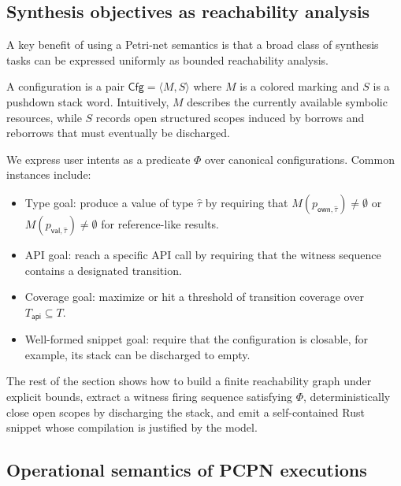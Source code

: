 \documentclass[sigconf]{acmart}
\begin{document}
\subsection{Synthesis objectives as reachability analysis}
\label{sec:analysis:objectives}
A key benefit of using a Petri-net semantics is that a broad class of synthesis tasks can be expressed uniformly as bounded reachability analysis.

A configuration is a pair $\mathsf{Cfg}=\langle M,S\rangle$ where $M$ is a colored marking and $S$ is a pushdown stack word. Intuitively, $M$ describes the currently available symbolic resources, while $S$ records open structured scopes induced by borrows and reborrows that must eventually be discharged.

We express user intents as a predicate $\Phi$ over canonical configurations.
Common instances include:
\begin{itemize}
\item Type goal: produce a value of type $\hat\tau$ by requiring that $M(p_{\mathsf{own},\hat\tau})\neq \emptyset$ or $M(p_{\mathsf{val},\hat\tau})\neq \emptyset$ for reference-like results.
\item API goal: reach a specific API call by requiring that the witness sequence contains a designated transition.
\item Coverage goal: maximize or hit a threshold of transition coverage over $T_{\mathsf{api}}\subseteq T$.
\item Well-formed snippet goal: require that the configuration is closable, for example, its stack can be discharged to empty.
\end{itemize}

The rest of the section shows how to build a finite reachability graph under explicit bounds, extract a witness firing sequence satisfying $\Phi$, deterministically close open scopes by discharging the stack, and emit a self-contained Rust snippet whose compilation is justified by the model.

\subsection{Operational semantics of PCPN executions}
\label{sec:analysis:semantics}
\end{document}
